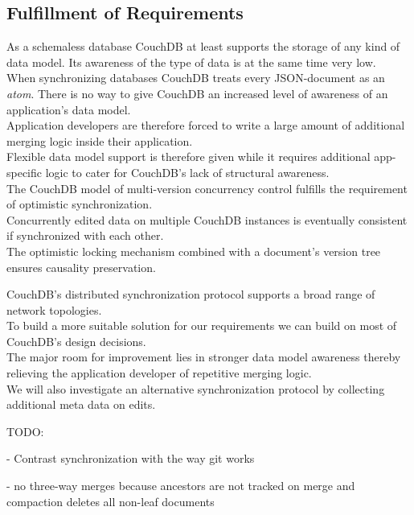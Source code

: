 \subsection{Fulfillment of Requirements}
As a schemaless database CouchDB at least supports the storage of any kind of data model.
Its awareness of the type of data is at the same time very low.\\
When synchronizing databases CouchDB treats every JSON-document as an \emph{atom}.
There is no way to give CouchDB an increased level of awareness of an application's data model.\\
Application developers are therefore forced to write a large amount of additional merging logic inside their application.\\
Flexible data model support is therefore given while it requires additional app-specific logic to cater for CouchDB's lack of structural awareness.\\

The CouchDB model of multi-version concurrency control fulfills the requirement of optimistic synchronization.\\
Concurrently edited data on multiple CouchDB instances is eventually consistent if synchronized with each other.\\
The optimistic locking mechanism combined with a document's version tree ensures causality preservation.

CouchDB's distributed synchronization protocol supports a broad range of network topologies.\\

To build a more suitable solution for our requirements we can build on most of CouchDB's design decisions.\\
The major room for improvement lies in stronger data model awareness thereby relieving the application developer of repetitive merging logic.\\
We will also investigate an alternative synchronization protocol by collecting additional meta data on edits.

TODO:

- Contrast synchronization with the way git works

- no three-way merges because ancestors are not tracked on merge and compaction deletes all non-leaf documents
